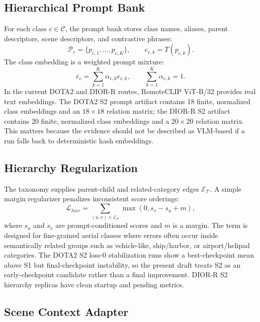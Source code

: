\documentclass[10pt]{article}
\begin{document}
\subsection{Hierarchical Prompt Bank}

For each class $c\in\mathcal{C}$, the prompt bank stores class names, aliases, parent descriptors, scene descriptors, and contrastive phrases:
\begin{equation}
    \mathcal{P}_c=\{p_{c,1},\ldots,p_{c,K}\}, \qquad e_{c,k}=T(p_{c,k}).
\end{equation}
The class embedding is a weighted prompt mixture:
\begin{equation}
    \bar{e}_c=\sum_{k=1}^{K}\alpha_{c,k}e_{c,k}, \qquad \sum_{k=1}^{K}\alpha_{c,k}=1.
\end{equation}
In the current DOTA2 and DIOR-R routes, RemoteCLIP ViT-B/32 provides real text embeddings. The DOTA2 S2 prompt artifact contains 18 finite, normalized class embeddings and an $18\times18$ relation matrix; the DIOR-R S2 artifact contains 20 finite, normalized class embeddings and a $20\times20$ relation matrix. This matters because the evidence should not be described as VLM-based if a run falls back to deterministic hash embeddings.

\subsection{Hierarchy Regularization}

The taxonomy supplies parent-child and related-category edges $\mathcal{E}_{\mathcal{T}}$. A simple margin regularizer penalizes inconsistent score orderings:
\begin{equation}
    \mathcal{L}_{hier}=
    \sum_{(u,v)\in\mathcal{E}_{\mathcal{T}}}
    \max(0, s_v-s_u+m),
\end{equation}
where $s_u$ and $s_v$ are prompt-conditioned scores and $m$ is a margin. The term is designed for fine-grained aerial classes where errors often occur inside semantically related groups such as vehicle-like, ship/harbor, or airport/helipad categories. The DOTA2 S2 loss-0 stabilization runs show a best-checkpoint mean above S1 but final-checkpoint instability, so the present draft treats S2 as an early-checkpoint candidate rather than a final improvement. DIOR-R S2 hierarchy replicas have clean startup and pending metrics.

\subsection{Scene Context Adapter}
\end{document}
